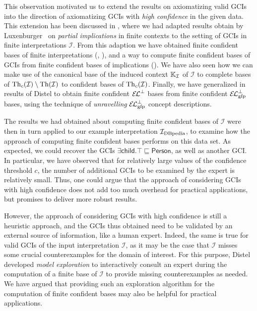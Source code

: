 This observation motivated us to extend the results on axiomatizing valid GCIs into the
direction of axiomatizing GCIs with \emph{high confidence} in the given data.  This
extension has been discussed in , where we had adapted results
obtain by Luxenburger~\cite{diss:Luxenburger} on \emph{partial implications} in finite
contexts to the setting of GCIs in finite interpretations $\mathcal{I}$.  From this
adaption we have obtained finite confident bases of finite interpretations
(, ), and a way to compute finite
confident bases of GCIs from finite confident bases of implications
().  We have also
seen how we can make use of the canonical base of the induced context ${\mathbb{K}}_{\mathcal{I}}$ of $\mathcal{I}$ to complete bases of $\operatorname{Th}_{c}(\mathcal{I}) \setminus
\operatorname{Th}(\mathcal{I})$ to confident bases of $\operatorname{Th}_{c}(\mathcal{I})$.  Finally, we have
generalized in  results of Distel to obtain finite confident
${{\mathcal{E}\kern-.3ex\mathcal{L}}^\bot}$ bases from finite confident ${{\mathcal{E}\kern-.3ex\mathcal{L}}_\text{gfp}^\bot}$ bases, using the technique of
\emph{unravelling} ${{\mathcal{E}\kern-.3ex\mathcal{L}}_\text{gfp}^\bot}$ concept descriptions.

The results we had obtained about computing finite confident bases of $\mathcal{I}$ were
then in turn applied to our example interpretation ${\mathcal{I}_{\text{DBpedia}}}$, to examine how the
approach of computing finite confident bases performs on this data set.  As expected, we
could recover the GCIs $\exists \mathsf{child}. \top \sqsubseteq \mathsf{Person}$, as well
as another GCI.  In particular, we have observed that for relatively large values of the
confidence threshold $c$, the number of additional GCIs to be examined by the expert is
relatively small.  Thus, one could argue that the approach of considering GCIs with high
confidence does not add too much overhead for practical applications, but promises to
deliver more robust results.

However, the approach of considering GCIs with high confidence is still a heuristic
approach, and the GCIs thus obtained need to be validated by an external source of
information, like a human expert.  Indeed, the same is true for valid GCIs of the input
interpretation $\mathcal{I}$, as it may be the case that $\mathcal{I}$ misses some crucial
counterexamples for the domain of interest.  For this purpose, Distel developed
\emph{model exploration} to interactively consult an expert during the computation of a
finite base of $\mathcal{I}$ to provide missing counterexamples as needed.  We have argued
that providing such an exploration algorithm for the computation of finite confident bases
may also be helpful for practical applications.

